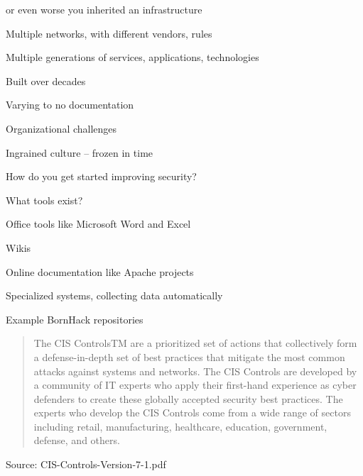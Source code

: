 \documentclass[Screen16to9,17pt]{foils}
\begin{document}

\begin{list1}
\item or even worse you inherited an infrastructure
\item Multiple networks, with different vendors, rules
\item Multiple generations of services, applications, technologies
\item Built over decades
\item Varying to no documentation
\item Organizational challenges
\item Ingrained culture -- frozen in time
\end{list1}

How do you get started improving security?





What tools exist?
\begin{list2}
\item Office tools like Microsoft Word and Excel
\item Wikis
\item Online documentation like Apache projects
\item Specialized systems, collecting data automatically
\item Example BornHack repositories\\
\end{list2}




\begin{quote}
  The CIS ControlsTM are a prioritized set of actions that collectively form a defense-in-depth set
of best practices that mitigate the most common attacks against systems and networks. The
CIS Controls are developed by a community of IT experts who apply their first-hand experience
as cyber defenders to create these globally accepted security best practices. The experts who
develop the CIS Controls come from a wide range of sectors including retail, manufacturing,
healthcare, education, government, defense, and others.
\end{quote}

Source:  CIS-Controls-Version-7-1.pdf
\end{document}
